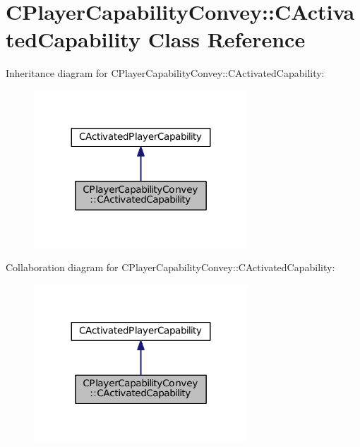 \hypertarget{classCPlayerCapabilityConvey_1_1CActivatedCapability}{}\section{C\+Player\+Capability\+Convey\+:\+:C\+Activated\+Capability Class Reference}
\label{classCPlayerCapabilityConvey_1_1CActivatedCapability}


Inheritance diagram for C\+Player\+Capability\+Convey\+:\+:C\+Activated\+Capability\+:\nopagebreak
\begin{figure}[H]
\begin{center}
\leavevmode
\includegraphics[width=227pt]{classCPlayerCapabilityConvey_1_1CActivatedCapability__inherit__graph}
\end{center}
\end{figure}


Collaboration diagram for C\+Player\+Capability\+Convey\+:\+:C\+Activated\+Capability\+:\nopagebreak
\begin{figure}[H]
\begin{center}
\leavevmode
\includegraphics[width=227pt]{classCPlayerCapabilityConvey_1_1CActivatedCapability__coll__graph}
\end{center}
\end{figure}
